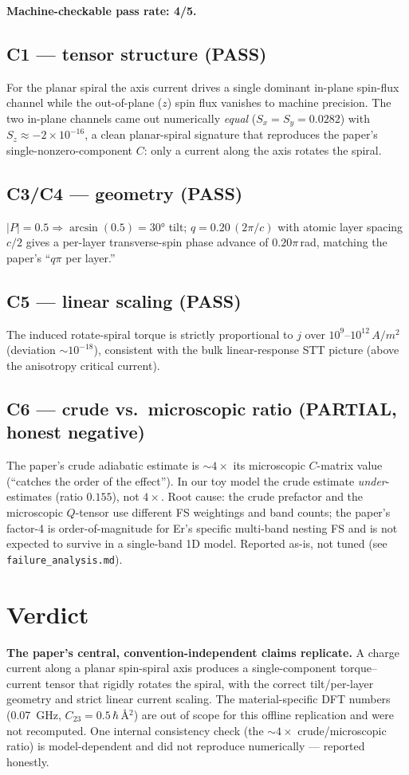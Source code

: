 \documentclass[11pt]{article}
\begin{document}
\noindent\textbf{Machine-checkable pass rate: 4/5.}

\subsection*{C1 --- tensor structure (PASS)}
For the planar spiral the axis current drives a single dominant in-plane
spin-flux channel while the out-of-plane ($z$) spin flux vanishes to machine
precision. The two in-plane channels came out numerically \emph{equal}
($S_x=S_y=0.0282$) with $S_z\approx-2\times10^{-16}$, a clean planar-spiral
signature that reproduces the paper's single-nonzero-component $C$: only a
current along the axis rotates the spiral.

\subsection*{C3/C4 --- geometry (PASS)}
$|P|=0.5\Rightarrow\arcsin(0.5)=\ang{30}$ tilt; $q=0.20\,(2\pi/c)$ with atomic
layer spacing $c/2$ gives a per-layer transverse-spin phase advance of
$0.20\pi$\,rad, matching the paper's ``$q\pi$ per layer.''

\subsection*{C5 --- linear scaling (PASS)}
The induced rotate-spiral torque is strictly proportional to $j$ over
$10^{9}$--$10^{12}\,\si{A/m^2}$ (deviation $\sim10^{-18}$), consistent with the
bulk linear-response STT picture (above the anisotropy critical current).

\subsection*{C6 --- crude vs.\ microscopic ratio (PARTIAL, honest negative)}
The paper's crude adiabatic estimate is $\sim4\times$ its microscopic $C$-matrix
value (``catches the order of the effect''). In our toy model the crude estimate
\emph{under}-estimates (ratio $0.155$), not $4\times$. Root cause: the crude
prefactor and the microscopic $Q$-tensor use different FS weightings and band
counts; the paper's factor-4 is order-of-magnitude for Er's specific multi-band
nesting FS and is not expected to survive in a single-band 1D model. Reported
as-is, not tuned (see \texttt{failure\_analysis.md}).

\section{Verdict}
\textbf{The paper's central, convention-independent claims replicate.} A charge
current along a planar spin-spiral axis produces a single-component
torque--current tensor that rigidly rotates the spiral, with the correct
tilt/per-layer geometry and strict linear current scaling. The material-specific
DFT numbers (\SI{0.07}{GHz}, $C_{23}=0.5\,\hbar\,\si{\angstrom^2}$) are out of
scope for this offline replication and were not recomputed. One internal
consistency check (the $\sim4\times$ crude/microscopic ratio) is model-dependent
and did not reproduce numerically --- reported honestly.
\end{document}
